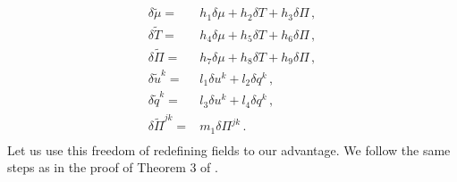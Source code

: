 \documentclass[a4paper, amsfonts, amssymb, amsmath, reprint, showkeys, nofootinbib, twoside, onecolumn,notitlepage]{revtex4-1}
\begin{document}
\begin{equation}\label{redefine}
\begin{split}
\delta \tilde{\mu} ={}& h_1 \delta \mu +h_2 \delta T +h_3 \delta \Pi \, , \\
\delta \tilde{T} ={}& h_4 \delta \mu +h_5 \delta T +h_6 \delta \Pi \, ,  \\
 \delta \tilde{\Pi} ={}& h_7 \delta \mu +h_8 \delta T +h_9 \delta \Pi \, ,  \\
 \delta \tilde{u}^k ={}& l_1 \delta u^k + l_2 \delta q^k \, ,  \\
 \delta \tilde{q}^k ={}& l_3 \delta u^k + l_4 \delta q^k \, ,  \\
 \delta \tilde{\Pi}^{jk} ={}& m_1 \delta \Pi^{jk} \, . \\
\end{split}
\end{equation}
Let us use this freedom of redefining fields to our advantage. We follow the same steps as in the proof of Theorem 3 of \cite{paperI}. 
\end{document}
